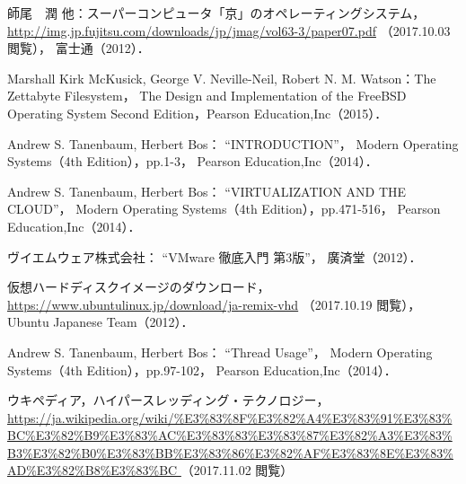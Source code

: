 \begin{thebibliography}{9}
師尾　潤 他：スーパーコンピュータ「京」のオペレーティングシステム，
\url{http://img.jp.fujitsu.com/downloads/jp/jmag/vol63-3/paper07.pdf}
（2017.10.03 閲覧），
富士通（2012）．

Marshall Kirk McKusick,
George V. Neville-Neil,
Robert N. M. Watson：The Zettabyte Filesystem，
The Design and Implementation of the FreeBSD Operating System
Second Edition，Pearson Education,Inc（2015）．


Andrew S. Tanenbaum, Herbert Bos：
``INTRODUCTION''，
Modern Operating Systems（4th Edition），pp.1-3，
Pearson Education,Inc（2014）．

Andrew S. Tanenbaum, Herbert Bos：
``VIRTUALIZATION AND THE CLOUD''，
Modern Operating Systems（4th Edition），pp.471-516，
Pearson Education,Inc（2014）．

ヴイエムウェア株式会社：
``VMware 徹底入門 第3版''，
廣済堂（2012）．

仮想ハードディスクイメージのダウンロード，
\url{https://www.ubuntulinux.jp/download/ja-remix-vhd}
（2017.10.19 閲覧），
Ubuntu Japanese Team（2012）．

Andrew S. Tanenbaum, Herbert Bos：
``Thread Usage''，
Modern Operating Systems（4th Edition），pp.97-102，
Pearson Education,Inc（2014）．

ウキペディア，ハイパースレッディング・テクノロジー，
\url{
https://ja.wikipedia.org/wiki/%
}（2017.11.02 閲覧）

\end{thebibliography}
